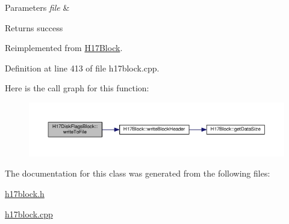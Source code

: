 \begin{DoxyParams}{Parameters}
{\em file} & \\
\hline
\end{DoxyParams}
\begin{DoxyReturn}{Returns}
success 
\end{DoxyReturn}


Reimplemented from \hyperlink{classH17Block_a59901675cd140c907fb6de4c8e0452d5}{H17\+Block}.



Definition at line 413 of file h17block.\+cpp.



Here is the call graph for this function\+:
\nopagebreak
\begin{figure}[H]
\begin{center}
\leavevmode
\includegraphics[width=350pt]{classH17DiskFlagsBlock_a50319616d0931d82ddfb58c00f5909c6_cgraph}
\end{center}
\end{figure}




The documentation for this class was generated from the following files\+:\begin{DoxyCompactItemize}
\item 
\hyperlink{h17block_8h}{h17block.\+h}\item 
\hyperlink{h17block_8cpp}{h17block.\+cpp}\end{DoxyCompactItemize}
